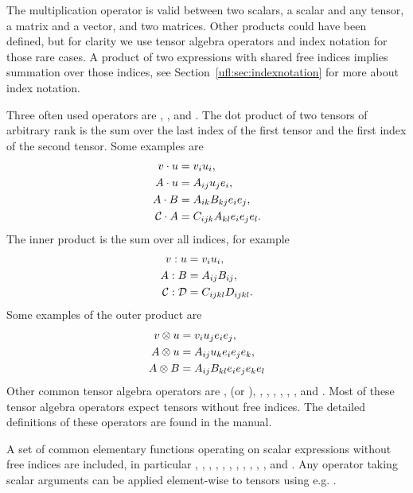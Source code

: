 The multiplication operator \emp{*} is valid between two scalars, a
scalar and any tensor, a matrix and a vector, and two matrices.  Other
products could have been defined, but for clarity we use tensor
algebra operators and index notation for those rare cases.  A product
of two expressions with shared free indices implies summation over
those indices, see Section~\ref{ufl:sec:indexnotation} for more about
index notation.

Three often used operators are , ,
and .  The dot product of two tensors of arbitrary
rank is the sum over the last index of the first tensor and the first
index of the second tensor.  Some examples are
\begin{align}
{v} \cdot {u} &= v_i u_i, \\
{A} \cdot {u} &= A_{ij} u_j {e}_i, \\
{A} \cdot {B} &= A_{ik} B_{kj} {e}_i {e}_j, \\
\mathcal{C} \cdot {A} &= C_{ijk} A_{kl} {e}_i {e}_j {e}_l.
\end{align}
The inner product is the sum over all indices, for example
\begin{align}
{v} : {u} &= v_i u_i, \\
{A} : {B} &= A_{ij} B_{ij}, \\
\mathcal{C} : \mathcal{D} &= C_{ijkl} D_{ijkl}.
\end{align}
Some examples of the outer product are
\begin{align}
{v} \otimes {u} &= v_i u_j {e}_i {e}_j, \\
{A} \otimes {u} &= A_{ij} u_k {e}_i {e}_j {e}_k, \\
{A} \otimes {B} &= A_{ij} B_{kl} {e}_i {e}_j {e}_k {e}_l
\end{align}
Other common tensor algebra operators are ,
 (or ), , ,
, , , , and
. Most of these tensor algebra operators expect tensors
without free indices. The detailed definitions of these operators are
found in the manual.

A set of common elementary functions operating on scalar expressions
without free indices are included, in particular , , , , ,
, , ,
, , ,
and . Any operator taking scalar arguments can be applied
element-wise to tensors using e.g. .

